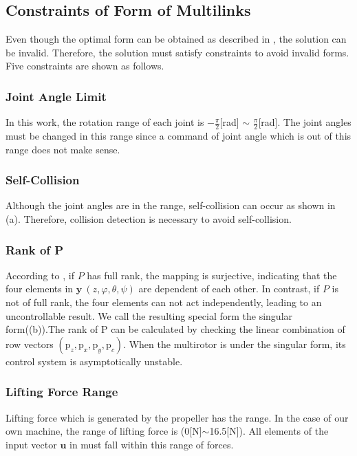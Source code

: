 \subsection{Constraints of Form of Multilinks}
 Even though the optimal form can be obtained as described in , the solution can be invalid. Therefore, the solution must satisfy constraints to avoid invalid forms. Five constraints are shown as follows.
\subsubsection{Joint Angle Limit}
In this work, the rotation range of each joint is $-\frac{\pi}{2}$[rad] $\sim$ $\frac{\pi}{2}$[rad]. The joint angles must be changed in this range since a command of joint angle which is out of this range does not make sense.
\subsubsection{Self-Collision}
Although the joint angles are in the range, self-collision can occur as shown in (a). Therefore, collision detection is necessary to avoid self-collision.
\subsubsection{Rank of P}
According to , if $P$ has full rank, the mapping is surjective, indicating that the four elements in $\bm{y} \ (z,\varphi, \theta, \psi)$ are dependent of each other. In contrast, if $P$ is not of full rank, the four elements can not act independently, leading to an uncontrollable result. We call the resulting special form the singular form((b)).The rank of P can be calculated by checking the linear combination of row vectors $(\bm{\mathrm{p}}_z , \bm{\mathrm{p}}_x , \bm{\mathrm{p}}_y , \bm{\mathrm{p}}_c )$. %
When the multirotor is under the singular form, its control system is asymptotically unstable.
\subsubsection{Lifting Force Range}
Lifting force which is generated by the propeller has the range. In the case of our own machine, the range of lifting force is (0[N]$\sim$16.5[N]). All elements of the input vector $\bm{u}$ in  must fall within this range of forces.
